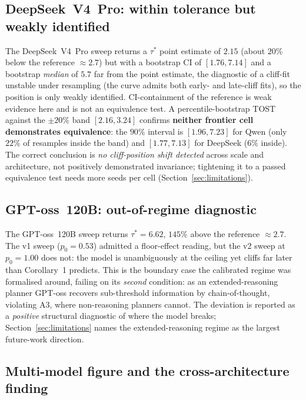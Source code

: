 \subsection{DeepSeek~V4~Pro: within tolerance but weakly identified}
\label{sec:frontier_deepseek}

The DeepSeek~V4~Pro sweep returns a $\tau^{*}$ point estimate of
$2.15$ (about $20\%$ below the reference $\approx2.7$) but with a
bootstrap CI of $[1.76, 7.14]$ and a bootstrap \emph{median} of $5.7$
far from the point estimate, the diagnostic of a cliff-fit unstable
under resampling (the curve admits both early- and late-cliff fits),
so the position is only weakly identified. CI-containment of the
reference is weak evidence here and is not an equivalence test. A
percentile-bootstrap TOST against the $\pm20\%$ band $[2.16,3.24]$
confirms \textbf{neither frontier cell demonstrates equivalence}: the
$90\%$ interval is $[1.96,7.23]$ for Qwen (only $22\%$ of resamples
inside the band) and $[1.77,7.13]$ for DeepSeek ($6\%$ inside). The
correct conclusion is \emph{no cliff-position shift detected} across
scale and architecture, not positively demonstrated invariance;
tightening it to a passed equivalence test needs more seeds per cell
(Section~\ref{sec:limitations}).

\subsection{GPT-oss~120B: out-of-regime diagnostic}
\label{sec:gptoss_repro}

The GPT-oss~120B sweep returns $\tau^{*}=6.62$, $145\%$ above the
reference $\approx2.7$. The v1 sweep ($p_0=0.53$) admitted a
floor-effect reading, but the v2 sweep at $p_0=1.00$ does not: the
model is unambiguously at the ceiling yet cliffs far later than
Corollary~1 predicts. This is the boundary case the calibrated regime
was formalised around, failing on its \emph{second} condition: as an
extended-reasoning planner GPT-oss recovers sub-threshold information
by chain-of-thought, violating A3, where non-reasoning planners
cannot. The deviation is reported as a
\emph{positive} structural diagnostic of where the model breaks;
Section~\ref{sec:limitations} names the extended-reasoning regime as
the largest future-work direction.

\subsection{Multi-model figure and the cross-architecture finding}

